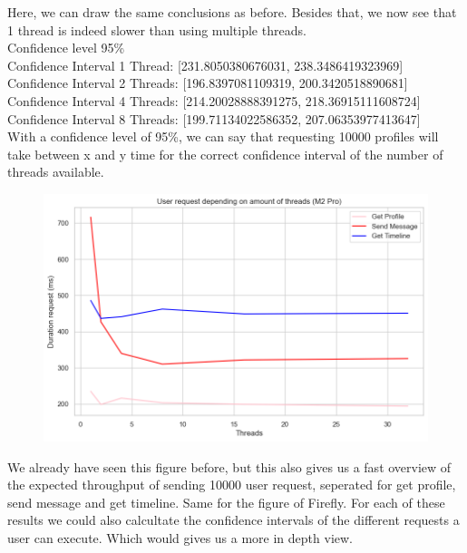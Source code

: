 \documentclass[a4paper]{article}
\begin{document}
Here, we can draw the same conclusions as before. Besides that, we now see that 1 thread is indeed slower than using multiple threads. \\
Confidence level 95\%\\
Confidence Interval 1 Thread: [231.8050380676031, 238.3486419323969] \\
Confidence Interval 2 Threads: [196.8397081109319, 200.3420518890681] \\
Confidence Interval 4 Threads: [214.20028888391275, 218.36915111608724] \\
Confidence Interval 8 Threads: [199.71134022586352, 207.06353977413647] \\

With a confidence level of 95\%, we can say that requesting 10000 profiles will take between x and y time for the correct confidence interval of the number of threads available.


\begin{figure}[H]
	\centering
	\includegraphics[width = \linewidth]{Images/Throughput.png}
	\caption{}
\end{figure}
We already have seen this figure before, but this also gives us a fast overview of the expected throughput of sending 10000 user request, seperated for get profile, send message and get timeline. Same for the figure of Firefly. For each of these results we could also calcultate the confidence intervals of the different requests a user can execute. Which would gives us a more in depth view. 
\end{document}
